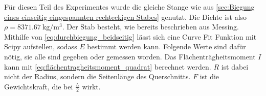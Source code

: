 \begin{table}
    \centering
    \caption{Messergebnisse zu dem beidseitig eingespannten rechteckigen Stab}
    \label{tab:beidseitig_eckig}
\end{table}

Für diesen Teil des Experimentes wurde die gleiche Stange wie aus \autoref{sec:Biegung eines einseitig eingespannten rechteckigen Stabes} genutzt. Die Dichte ist also $\rho = \SI{8371.67}{\kilogram \per \cubic\meter}$. Der Stab besteht, wie bereits beschrieben aus Messing. Mithilfe von \autoref{eq:durchbiegung_beidseitig} lässt sich eine Curve Fit Funktion mit Scipy aufstellen, sodass $E$ bestimmt werden kann. Folgende Werte sind dafür nötig, sie alle sind gegeben oder gemessen worden. Das Flächenträgheitsmoment $I$ kann mit \autoref{eq:flächentragheitsmoment_quadrat} berechnet werden. $R$ ist dabei nicht der Radius, sondern die Seitenlänge des Querschnitts. $F$ ist die Gewichtskraft, die bei $\frac{L}{2}$ wirkt.  

